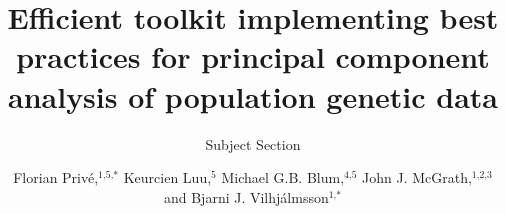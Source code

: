 \documentclass{bioinfo}
\begin{document}
	

\subtitle{Subject Section}

\title[Efficient PCA Toolkit for Genetic Data]{Efficient toolkit implementing best practices for principal component analysis of population genetic data}

\author[Priv\'e \textit{et~al}.]{Florian Priv\'e,$^{\text{1,5,}*}$ Keurcien Luu,$^{\text{5}}$ Michael G.B. Blum,$^{\text{4,5}}$ John J. McGrath,$^{\text{1,2,3}}$ and Bjarni J. Vilhj\'almsson$^{\text{1,}*}$}

\address{$^{\text{\sf 1}}$National Centre for Register-Based Research, Aarhus University, Aarhus, 8210, Denmark. \\
$^{\text{\sf 2}}$Queensland Brain Institute, University of Queensland, St. Lucia, 4072, Queensland, Australia. \\
$^{\text{\sf 3}}$Queensland Centre for Mental Health Research, The Park Centre for Mental Health, Wacol, 4076, Queensland, Australia. \\
$^{\text{\sf 4}}$OWKIN France, Paris, 75010, France. \\
$^{\text{\sf 5}}$Laboratoire TIMC-IMAG, UMR 5525, Univ.\ Grenoble Alpes, La Tronche, 38700, France.}



\end{document}
